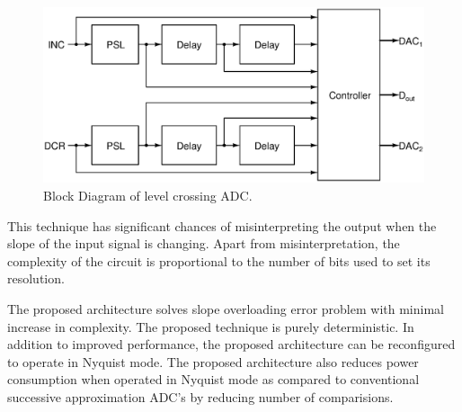 \begin{figure}[h]
	\begin{center}
		\includegraphics[scale=0.45]{./Figures/REFC.ps}
		\caption{Block Diagram of level crossing ADC.}
		\label{fig:REFC}
	\end{center}
\end{figure}

\par
\hspace{0.6cm} This technique has significant chances of misinterpreting the output when the slope of the input signal is changing. Apart from misinterpretation, the complexity of the circuit is proportional to the number of bits used to set its resolution.



 
\par
\hspace{0.6cm} The proposed architecture solves slope overloading error problem with minimal increase in complexity. The proposed technique is purely deterministic. In addition to improved performance, the proposed architecture can be reconfigured to operate in Nyquist mode. The proposed architecture also reduces power consumption when operated in Nyquist mode as compared to conventional successive approximation ADC's by reducing number of comparisions.



















